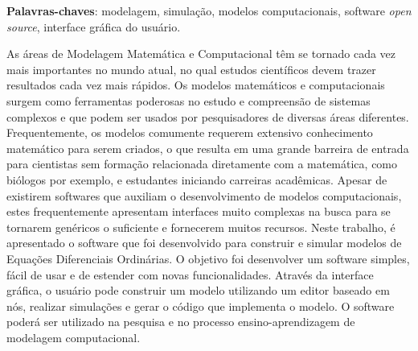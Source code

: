 \begin{resumo}
	
	
	\vspace{\onelineskip}
	
	\noindent
	\textbf{Palavras-chaves}: modelagem, simulação, modelos computacionais, software \textit{open source}, interface gráfica do usuário.
	
	As áreas de Modelagem Matemática e Computacional têm se tornado cada vez mais importantes no mundo atual, no qual estudos científicos devem trazer resultados cada vez mais rápidos. Os modelos matemáticos e computacionais surgem como ferramentas poderosas no estudo e compreensão de sistemas complexos e que podem ser usados por pesquisadores de diversas áreas diferentes. Frequentemente, os modelos comumente requerem extensivo conhecimento matemático para serem criados, o que resulta em uma grande barreira de entrada para cientistas sem formação relacionada diretamente com a matemática, como biólogos por exemplo, e estudantes iniciando carreiras acadêmicas. Apesar de existirem softwares que auxiliam o desenvolvimento de modelos computacionais, estes frequentemente apresentam interfaces muito complexas na busca para se tornarem genéricos o suficiente e fornecerem muitos recursos. Neste trabalho, é apresentado o software que foi desenvolvido para construir e simular modelos de Equações Diferenciais Ordinárias. O objetivo foi desenvolver um software simples, fácil de usar e de estender com novas funcionalidades. Através da interface gráfica, o usuário pode construir um modelo utilizando um editor baseado em nós, realizar simulações e gerar o código que implementa o modelo. O software poderá ser utilizado na pesquisa e no processo ensino-aprendizagem de modelagem computacional. 
	
\end{resumo}

